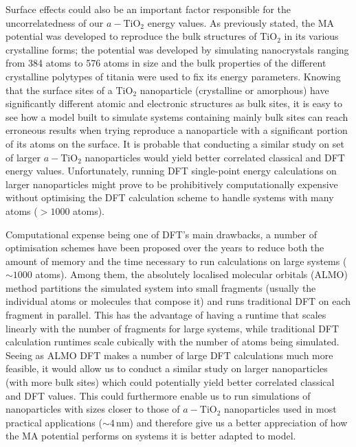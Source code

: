 \documentclass[aps,prb,twocolumn,amsmath,amssymb,superscriptaddress,longbibliography]{revtex4-1}
\newcommand\tab[1][1cm]{\hspace*{#1}} %
\begin{document}
\tab Surface effects could also be an important factor responsible for the uncorrelatedness of our $a-\text{TiO}_2$ energy values.  
As previously stated, the MA potential was developed to reproduce the bulk structures of $\text{TiO}_2$ in its various crystalline forms; the potential was developed by simulating nanocrystals ranging from 384 atoms to 576 atoms in size and the bulk properties of the different crystalline polytypes of titania were used to fix its energy parameters\cite{MA_og}.
Knowing that the surface sites of a $\text{TiO}_2$ nanoparticle (crystalline or amorphous) have significantly different atomic and electronic structures as bulk sites\cite{vvh1,realistic_nnp,vvh2}, it is easy to see how a model built to simulate systems containing mainly bulk sites can reach erroneous results when trying reproduce a nanoparticle with a significant portion of its atoms on the surface.
It is probable that conducting a similar study on set of larger $a-\text{TiO}_2$ nanoparticles would yield better correlated classical and DFT energy values.
Unfortunately, running DFT single-point energy calculations on larger nanoparticles might prove to be prohibitively computationally expensive without optimising the DFT calculation scheme to handle systems with many atoms ($>1000$ atoms).

\tab Computational expense being one of DFT's main drawbacks, a number of optimisation schemes have been proposed over the years to reduce both the amount of memory and the time necessary to run calculations on large systems ($\sim 1000$ atoms).
Among them, the absolutely localised molecular orbitals\cite{almo} (ALMO) method partitions the simulated system into small fragments (usually the individual atoms or molecules that compose it) and runs traditional DFT on each fragment in parallel.
This has the advantage of having a runtime that scales linearly with the number of fragments for large systems, while traditional DFT calculation runtimes scale cubically with the number of atoms being simulated.
Seeing as ALMO DFT makes a number of large DFT calculations much more feasible, it would allow us to conduct a similar study on larger nanoparticles (with more bulk sites) which could potentially yield better correlated classical and DFT values.
This could furthermore enable us to run simulations of nanoparticles with sizes closer to those of $a-\text{TiO}_2$ nanoparticles used in most practical applications ($\sim 4\,$nm\cite{realistic_nnp}) and therefore give us a better appreciation of how the MA potential performs on systems it is better adapted to model.
\end{document}
